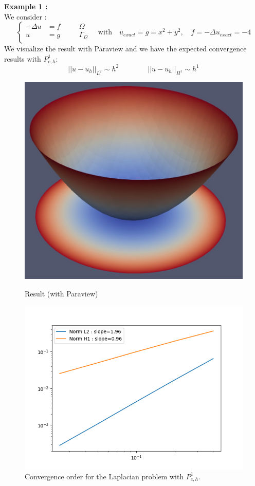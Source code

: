\noindent\textbf{Example 1 :} \\
We consider :
$$\left\{\begin{aligned}
	-\Delta u &= f \quad&&\Omega \\
	u&=g \quad&&\Gamma_D \\
\end{aligned}\right. \quad \text{with} \quad
u_{exact}=g=x^2+y^2, \quad f=-\Delta u_{exact}=-4$$
\noindent We visualize the result with Paraview and we have the expected convergence results  with $P_{c,h}^1$:
$$||u-u_h||_{L^2}\sim h^2 \qquad \qquad ||u-u_h||_{H^1}\sim h^1$$
\begin{figure}[H]
	\begin{minipage}{0.48\linewidth}
		\centering
		\includegraphics[width=0.8\linewidth]{"images/parareal/feelpp/circle_result.jpg"}
		\caption{Result (with Paraview)}
	\end{minipage}
	\begin{minipage}{0.48\linewidth}
		\centering\includegraphics[width=0.9\linewidth]{"images/parareal/feelpp/cvg_laplacian_k1_o2.png"}
		\caption{Convergence order for the Laplacian problem with $P_{c,h}^1$.}
	\end{minipage}
\end{figure}

